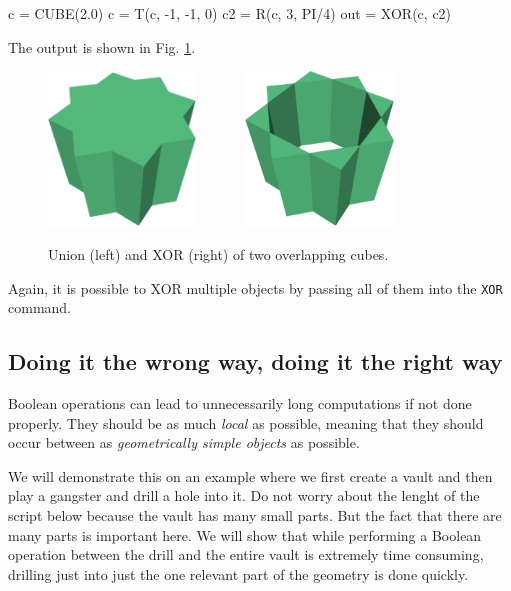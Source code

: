 \begin{bluecode}
c = CUBE(2.0)
c = T(c, -1, -1, 0)
c2 = R(c, 3, PI/4)
out = XOR(c, c2) 
\end{bluecode}
The output is shown in Fig. \ref{fig:xor-1}.

\begin{figure}[!ht]
\begin{center}
\includegraphics[width=0.35\textwidth]{img/xor-new1a.png}\ \ \ \ \ \ \ 
\includegraphics[width=0.35\textwidth]{img/xor-new.png}
\end{center}
\vspace{-4mm}
\caption{Union (left) and XOR (right) of two overlapping cubes.}
\label{fig:xor-1}
\end{figure}
\noindent
Again, it is possible to XOR multiple objects by passing all of them 
into the {\tt XOR} command.

\subsection{Doing it the wrong way, doing it the right way}

Boolean operations can lead to unnecessarily long computations if not done 
properly. They should be as much {\em local} as possible, meaning that 
they should occur between as {\em geometrically simple objects} as possible.

We will demonstrate this on an example where we first create a vault and then play 
a gangster and drill a hole into it. Do not worry about the lenght of the script below  because
the vault has many small parts. But the fact that there are many parts is important here.
We will show that while performing a Boolean operation between the drill and the entire
vault is extremely time consuming, drilling just into just the one relevant part
of the geometry is done quickly.

